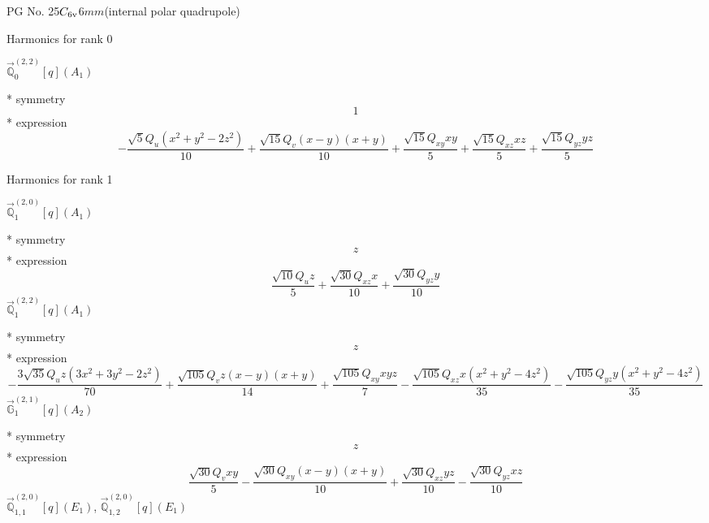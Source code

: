 \documentclass[fleqn,8pt]{jsarticle}
\begin{document}
\setcounter{MaxMatrixCols}{32}

\renewcommand{\tablename}{Table~}
\renewcommand{\figurename}{Figure~}
\begin{center}
\LARGE
PG No. 25\quad$C_{\rm 6v}$\quad$6mm$\quad[ hexagonal ] (internal polar quadrupole)
\end{center}

\noindent * Harmonics for rank 0

\noindent\quad $\vec{\mathbb{Q}}_{0}^{(2,2)}[q](A_{1})$

\noindent\quad ** symmetry
\begin{dmath*}
1
\end{dmath*}
\noindent\quad ** expression
\begin{dmath*}
- \frac{\sqrt{5} Q_{u} \left(x^{2} + y^{2} - 2 z^{2}\right)}{10} + \frac{\sqrt{15} Q_{v} \left(x - y\right) \left(x + y\right)}{10} + \frac{\sqrt{15} Q_{xy} x y}{5} + \frac{\sqrt{15} Q_{xz} x z}{5} + \frac{\sqrt{15} Q_{yz} y z}{5}
\end{dmath*}

\noindent * Harmonics for rank 1

\noindent\quad $\vec{\mathbb{Q}}_{1}^{(2,0)}[q](A_{1})$

\noindent\quad ** symmetry
\begin{dmath*}
z
\end{dmath*}
\noindent\quad ** expression
\begin{dmath*}
\frac{\sqrt{10} Q_{u} z}{5} + \frac{\sqrt{30} Q_{xz} x}{10} + \frac{\sqrt{30} Q_{yz} y}{10}
\end{dmath*}
\noindent\quad $\vec{\mathbb{Q}}_{1}^{(2,2)}[q](A_{1})$

\noindent\quad ** symmetry
\begin{dmath*}
z
\end{dmath*}
\noindent\quad ** expression
\begin{dmath*}
- \frac{3 \sqrt{35} Q_{u} z \left(3 x^{2} + 3 y^{2} - 2 z^{2}\right)}{70} + \frac{\sqrt{105} Q_{v} z \left(x - y\right) \left(x + y\right)}{14} + \frac{\sqrt{105} Q_{xy} x y z}{7} - \frac{\sqrt{105} Q_{xz} x \left(x^{2} + y^{2} - 4 z^{2}\right)}{35} - \frac{\sqrt{105} Q_{yz} y \left(x^{2} + y^{2} - 4 z^{2}\right)}{35}
\end{dmath*}
\noindent\quad $\vec{\mathbb{G}}_{1}^{(2,1)}[q](A_{2})$

\noindent\quad ** symmetry
\begin{dmath*}
z
\end{dmath*}
\noindent\quad ** expression
\begin{dmath*}
\frac{\sqrt{30} Q_{v} x y}{5} - \frac{\sqrt{30} Q_{xy} \left(x - y\right) \left(x + y\right)}{10} + \frac{\sqrt{30} Q_{xz} y z}{10} - \frac{\sqrt{30} Q_{yz} x z}{10}
\end{dmath*}
\noindent\quad $\vec{\mathbb{Q}}_{1,1}^{(2,0)}[q](E_{1})$, $\vec{\mathbb{Q}}_{1,2}^{(2,0)}[q](E_{1})$
\end{document}
